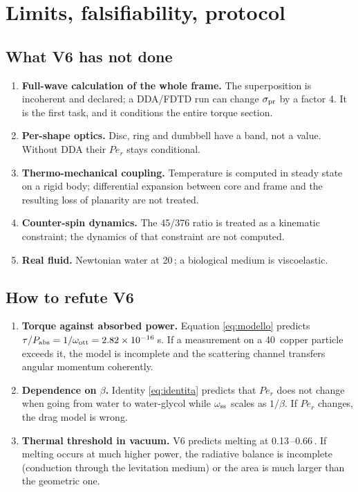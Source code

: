 \documentclass[11pt,a4paper]{article}
\providecommand{\micro}{\textmu}
\providecommand{\degreeCelsius}{\textcelsius}
\providecommand{\SI}[2]{#1\,\text{#2}}
\begin{document}
\section{Limits, falsifiability, protocol}
\label{sec:limiti}

\subsection{What V6 has not done}
\begin{enumerate}\itemsep2pt
\item \textbf{Full-wave calculation of the whole frame.} The superposition is
incoherent and declared; a DDA/FDTD run can change $\sigma_{\rm pr}$ by a factor 4. It
is the first task, and it conditions the entire torque section.
\item \textbf{Per-shape optics.} Disc, ring and dumbbell have a band, not a value.
Without DDA their $Pe_r$ stays conditional.
\item \textbf{Thermo-mechanical coupling.} Temperature is computed in steady state on
a rigid body; differential expansion between core and frame and the resulting loss of
planarity are not treated.
\item \textbf{Counter-spin dynamics.} The 45/376 ratio is treated as a kinematic
constraint; the dynamics of that constraint are not computed.
\item \textbf{Real fluid.} Newtonian water at \SI{20}{\degreeCelsius}; a biological
medium is viscoelastic.
\end{enumerate}

\subsection{How to refute V6}
\begin{enumerate}\itemsep2pt
\item \textbf{Torque against absorbed power.} Equation \eqref{eq:modello} predicts
$\tau/P_{\rm abs}=1/\omega_{\rm ott}=2.82\times10^{-16}$\,s. If a measurement on a
\SI{40}{nm} copper particle exceeds it, the model is incomplete and the scattering
channel transfers angular momentum coherently.
\item \textbf{Dependence on $\beta$.} Identity \eqref{eq:identita} predicts that $Pe_r$
does not change when going from water to water-glycol while $\omega_{\rm ss}$ scales as
$1/\beta$. If $Pe_r$ changes, the drag model is wrong.
\item \textbf{Thermal threshold in vacuum.} V6 predicts melting at
\SI{0.13}{}--\SI{0.66}{\micro W}. If melting occurs at much higher power, the radiative
balance is incomplete (conduction through the levitation medium) or the area is much
larger than the geometric one.
\end{enumerate}
\end{document}
